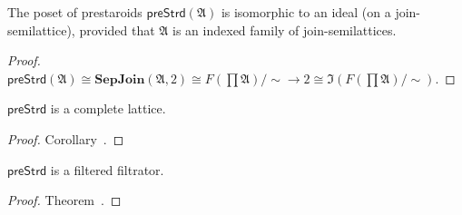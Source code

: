 \begin{cor}
  The poset of prestaroids
  $\mathsf{preStrd} (\mathfrak{A})$ is isomorphic to an ideal
  (on a join-semilattice), provided that $\mathfrak{A}$ is an indexed family
  of join-semilattices.
\end{cor}

\begin{proof}
  $\mathsf{preStrd} (\mathfrak{A}) \cong \mathbf{SepJoin} (\mathfrak{A}, 2)
  \cong F \left( \prod \mathfrak{A} \right) / \sim \rightarrow 2 \cong
  \mathfrak{I} \left( F \left( \prod \mathfrak{A} \right) / \sim \right)$.
\end{proof}


\begin{cor}
$\mathsf{preStrd}$ is a complete lattice.
\end{cor}

\begin{proof}
Corollary~.
\end{proof}

\begin{cor}
$\mathsf{preStrd}$ is a filtered filtrator.
\end{cor}

\begin{proof}
Theorem~.
\end{proof}

